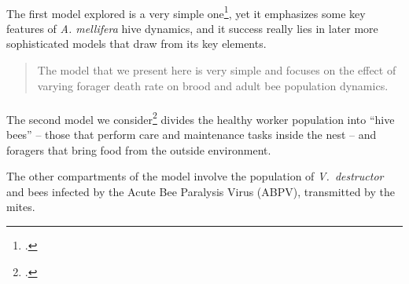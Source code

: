 \paragraph{}
The first model explored is a very simple one\footcite{khoury2011},
yet it emphasizes some key features of \emph{A. mellifera} hive dynamics,
and it success really lies in later more sophisticated models that draw from its key elements.

\blockquote[\citeauthor{khoury2011}]{The model that we present here is very simple and focuses on the effect of varying forager death rate on brood and adult bee population dynamics.}

\paragraph{}
The second model we consider\footcite{ratti2017} divides the healthy worker population into ``hive bees'' -- those that perform care and maintenance tasks inside the nest -- and foragers that bring food from the outside environment.

The other compartments of the model involve the population of \emph{V.~destructor} and bees infected by the Acute Bee Paralysis Virus (ABPV), transmitted by the mites.




